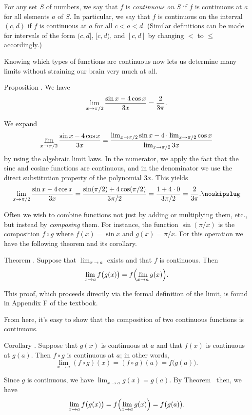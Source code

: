 For any set $S$ of numbers, we say that $f$ is {\it continuous on $S$} if $f$ is continuous at $a$ for all
elements $a$ of $S$. In particular, we say that $f$ is continuous on the interval $(c,d)$ if $f$ is continuous
at $a$ for all $c<a<d$. (Similar definitions can be made for intervals of the form
$(c,d]$, $[c,d)$, and $[c,d]$ by changing $<$ to $\le$ accordingly.)

Knowing which types of functions are continuous now lets us determine many limits without straining our
brain very much at all.

\proclaim Proposition \advthm. We have
$$\lim_{x\to \pi/2} {\sin x - 4\cos x\over 3x} = {2\over 3\pi}.$$

\proof We expand
$$\lim_{x\to \pi/2} {\sin x - 4\cos x\over 3x}
= {\lim_{x\to\pi/2} \sin x - 4\cdot \lim_{x\to \pi/2}\cos x\over \lim_{x\to \pi/2} 3x}$$
by using the algebraic limit laws. In the numerator, we apply the fact that the sine and cosine functions
are continuous,
and in the denominator we use the direct substitution property of the polynomial $3x$. This yields
$$\lim_{x\to \pi/2} {\sin x - 4\cos x\over 3x}
= {\sin(\pi/2) + 4\cos(\pi/2) \over 3\pi/2} = {1+4\cdot 0 \over 3\pi/2} = {2\over 3\pi}.\noskipslug $$

Often we wish to combine functions not just by adding or multiplying them, etc., but instead by {\it composing}
them. For instance, the function $\sin(\pi/x)$ is the composition $f\circ g$ where $f(x) = \sin x$ and
$g(x)=\pi/x$. For this operation we have the following theorem and its corollary.

\edef\thmlimcontinterchange{\the\thmcount}
\proclaim Theorem \advthm. Suppose that $\lim_{x\to a}$ exists and that $f$ is continuous. Then
$$\lim_{x\to a} f\bigl( g(x)\bigr) = f\Bigl( \lim_{x\to a} g(x)\Bigr).$$

\proof This proof, which proceeds directly via the formal definition of the limit,
is found in Appendix F of the textbook.\slug

From here, it's easy to show that the composition of two continuous functions is continuous.

\edef\corcontcomp{\the\thmcount}
\proclaim Corollary \advthm. Suppose that $g(x)$ is continuous at $a$ and that $f(x)$ is continuous at $g(a)$.
Then $f\circ g$ is continuous at $a$; in other words,
$$\lim_{x\to a} (f\circ g)(x) = (f\circ g)(a) = f\bigl( g(a)\bigr).$$

\proof Since $g$ is continuous, we have $\lim_{x\to a} g(x) = g(a)$. By Theorem~{\thmlimcontinterchange} then,
we have
$$\lim_{x\to a} f\bigl( g(x)\bigr) = f\Bigl( \lim_{x\to a} g(x)\Bigr) = f\bigl( g(a)\bigr).$$

